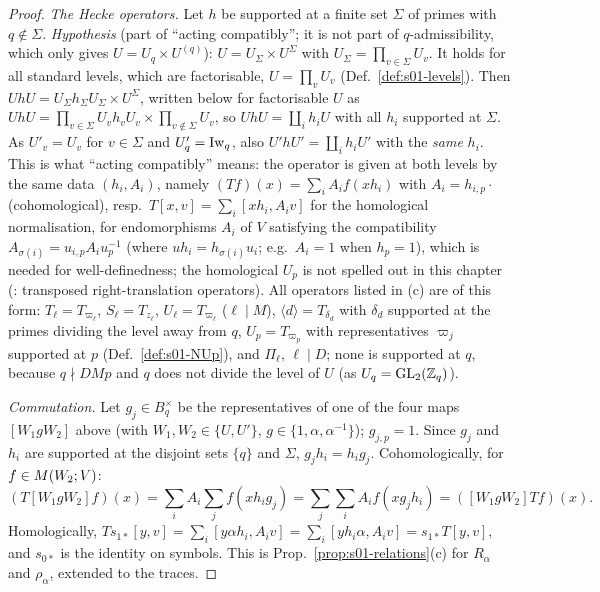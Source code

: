 \begin{proof}
\emph{The Hecke operators.} Let $h$ be supported at a finite set $\Sigma$ of primes with $q\notin\Sigma$. \emph{Hypothesis} (part of
``acting compatibly''; it is not part of $q$-admissibility, which only gives $U=U_q\times U^{(q)}$): $U=U_\Sigma\times U^\Sigma$ with
$U_\Sigma=\prod_{v\in\Sigma}U_v$. It holds for all standard levels, which are factorisable, $U=\prod_vU_v$ (Def.~\ref{def:s01-levels}).
Then $UhU=U_\Sigma h_\Sigma U_\Sigma\times U^\Sigma$, written below for factorisable $U$ as
$UhU=\prod_{v\in\Sigma}U_vh_vU_v\times\prod_{v\notin\Sigma}U_v$, so $UhU=\coprod_ih_iU$ with all $h_i$ supported at $\Sigma$. As
$U'_v=U_v$ for $v\in\Sigma$ and $U'_q=\mathrm{Iw}_q$, also $U'hU'=\coprod_ih_iU'$ with the \emph{same} $h_i$. This is what ``acting compatibly''
means: the operator is given at both levels by the same data $(h_i,A_i)$, namely $(Tf)(x)=\sum_iA_if(xh_i)$ with $A_i=h_{i,p}\cdot$
(cohomological), resp.\ $T[x,v]=\sum_i[xh_i,A_iv]$ for the homological normalisation, for endomorphisms $A_i$ of $V$ satisfying the compatibility $A_{\sigma(i)}=u_{i,p}A_iu_p^{-1}$ (where $uh_i=h_{\sigma(i)}u_i$; e.g.\ $A_i=1$ when $h_p=1$), which is needed for well-definedness; the homological $U_p$ is not spelled out in this chapter
(: transposed right-translation operators). All operators listed in (c) are of this form: $T_\ell=T_{\varpi_\ell}$,
$S_\ell=T_{z_\ell}$, $U_\ell=T_{\varpi_\ell}$ ($\ell\mid M$), $\langle d\rangle=T_{\delta_d}$ with $\delta_d$ supported at the primes dividing
the level away from $q$, $U_p=T_{\varpi_p}$ with representatives $\varpi_j$ supported at $p$ (Def.~\ref{def:s01-NUp}), and $\Pi_\ell$,
$\ell\mid D$; none is supported at $q$, because $q\nmid DMp$ and $q$ does not divide the level of $U$ (as $U_q=\mathrm{GL}_2(\mathbb{Z}_q)$).

\emph{Commutation.} Let $g_j\in B_q^\times$ be the representatives of one of the four maps $[W_1gW_2]$ above (with $W_1,W_2\in\{U,U'\}$,
$g\in\{1,\alpha,\alpha^{-1}\}$); $g_{j,p}=1$. Since $g_j$ and $h_i$ are supported at the disjoint sets $\{q\}$ and $\Sigma$, $g_jh_i=h_ig_j$.
Cohomologically, for $f\in M(W_2;V)$:
\[(T[W_1gW_2]f)(x)=\sum_iA_i\sum_jf(xh_ig_j)=\sum_j\sum_iA_if(xg_jh_i)=([W_1gW_2]Tf)(x).\]
Homologically, $Ts_{1*}[y,v]=\sum_i[y\alpha h_i,A_iv]=\sum_i[yh_i\alpha,A_iv]=s_{1*}T[y,v]$, and $s_{0*}$ is the identity on symbols.
This is Prop.~\ref{prop:s01-relations}(c) for $R_\alpha$ and $\rho_\alpha$, extended to the traces.
\end{proof}

